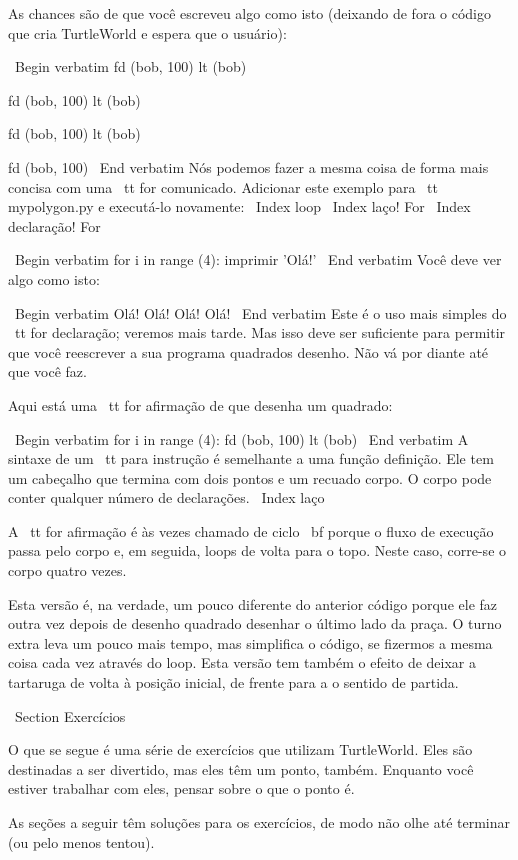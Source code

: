 \documentclass[10pt]{book}
\begin{document}
\begin {itemize}
{As chances são de que você escreveu algo como isto (deixando de fora o código
que cria TurtleWorld e espera que o usuário):

\ Begin {verbatim}
fd (bob, 100)
lt (bob)

fd (bob, 100)
lt (bob)

fd (bob, 100)
lt (bob)

fd (bob, 100)
\ End {verbatim}
%
Nós podemos fazer a mesma coisa de forma mais concisa com uma {\ tt for} comunicado.
Adicionar este exemplo para {\ tt mypolygon.py} e executá-lo novamente:
\ Index {loop}
\ Index {laço! For}
\ Index {declaração! For}

\ Begin {verbatim}
for i in range (4):
    imprimir 'Olá!'
\ End {verbatim}
%
Você deve ver algo como isto:

\ Begin {verbatim}
Olá!
Olá!
Olá!
Olá!
\ End {verbatim}
%
Este é o uso mais simples do {\ tt for} declaração; veremos
mais tarde. Mas isso deve ser suficiente para permitir que você reescrever a sua
programa quadrados desenho. Não vá por diante até que você faz.

Aqui está uma {\ tt for} afirmação de que desenha um quadrado:

\ Begin {verbatim}
for i in range (4):
    fd (bob, 100)
    lt (bob)
\ End {verbatim}
%
A sintaxe de um {\ tt} para instrução é semelhante a uma função
definição. Ele tem um cabeçalho que termina com dois pontos e um recuado
corpo. O corpo pode conter qualquer número de declarações.
\ Index {laço}

A {\ tt for} afirmação é às vezes chamado de ciclo {\ bf} porque
o fluxo de execução passa pelo corpo e, em seguida, loops de volta
para o topo. Neste caso, corre-se o corpo quatro vezes.

Esta versão é, na verdade, um pouco diferente do anterior
código porque ele faz outra vez depois de desenho quadrado
desenhar o último lado da praça. O turno extra leva um pouco
mais tempo, mas simplifica o código, se fizermos a mesma coisa
cada vez através do loop. Esta versão tem também o efeito
de deixar a tartaruga de volta à posição inicial, de frente para a
o sentido de partida.

\ Section {Exercícios}

O que se segue é uma série de exercícios que utilizam TurtleWorld. Eles
são destinadas a ser divertido, mas eles têm um ponto, também. Enquanto você estiver
trabalhar com eles, pensar sobre o que o ponto é.

As seções a seguir têm soluções para os exercícios, de modo
não olhe até terminar (ou pelo menos tentou).

}
\end{itemize}
\end{document}
